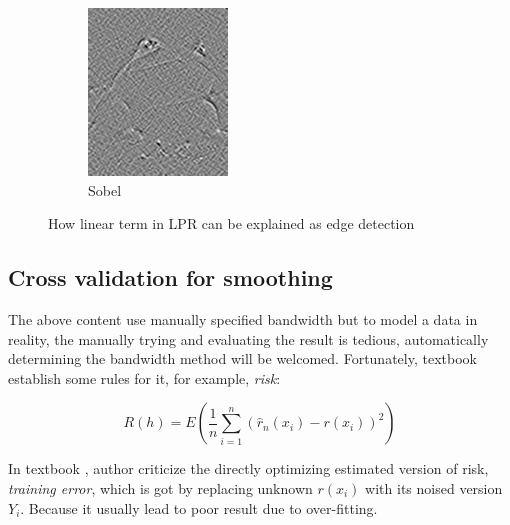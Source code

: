 \documentclass{article}
\begin{document}
\begin{figure}[htb]
\begin{subfigure}[b]{0.24\linewidth}
    \includegraphics[width=\linewidth]{images/edge_4.png}
    \caption{Sobel}
  \end{subfigure}
  \caption{How linear term in LPR can be explained as edge detection}
  \label{fig:edge}
\end{figure}



\subsection{Cross validation for smoothing}

The above content use manually specified bandwidth but to model a data in reality, 
the manually trying and evaluating the result is tedious, 
automatically determining the bandwidth method will be welcomed.
Fortunately, textbook \cite{wasserman2006all} establish some rules for it, for example, \emph{risk}: 

$$
R(h) = E \left( \frac{1}{n}\sum_{i=1}^n(\hat{r}_n(x_i)-r(x_i))^2 \right)
$$

In textbook \cite{wasserman2006all}, author criticize the directly optimizing estimated version of risk,
\emph{training error}, which is got by replacing unknown $r(x_i)$ with its noised version $Y_i$. 
Because it usually lead to poor result due to over-fitting.  
\end{document}
